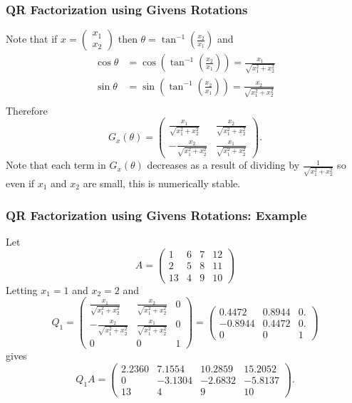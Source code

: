 \documentclass{beamer}
\begin{document}
\begin{frame}\frametitle{QR Factorization using Givens Rotations}
	Note that if $x = \begin{pmatrix} x_1 \\ x_2 \end{pmatrix}$ then
	\(
	\theta = \tan^{-1}\left(\frac{x_2}{x_1}\right)
	\)
	and
	\begin{align*}
		\cos\theta &= \cos\left(\tan^{-1}\left(\frac{x_2}{x_1}\right)\right) = \frac{x_1}{\sqrt{x_1^2 + x_2^2}} \\
		\sin\theta &= \sin\left(\tan^{-1}\left(\frac{x_2}{x_1}\right)\right) = \frac{x_2}{\sqrt{x_1^2 + x_2^2}} \\
	\end{align*}
	Therefore
	\[ 
		G_x(\theta) = 
			\begin{pmatrix}
	    		\frac{x_1}{\sqrt{x_1^2 + x_2^2}} & \frac{x_2}{\sqrt{x_1^2 + x_2^2}}\\
	    		-\frac{x_2}{\sqrt{x_1^2 + x_2^2}} & \frac{x_1}{\sqrt{x_1^2 + x_2^2}}
	  		\end{pmatrix}.
	\]
	Note that each term in $G_x(\theta)$ decreases as a result of dividing by $ \frac{1}{\sqrt{x_1^2+x_2^2}} $ so even if $x_1$ and $x_2$ are small, this is numerically stable.

\end{frame}

\begin{frame}\frametitle{QR Factorization using Givens Rotations: Example}
	Let
	\[
		A = \begin{pmatrix}
 				1 & 6 & 7 & 12 \\
 				2 & 5 & 8 & 11 \\
 				13 & 4 & 9 & 10
 			\end{pmatrix}
	\]
	Letting $x_1=1$ and $x_2=2$ and 
	\[
		Q_1 = 
			\begin{pmatrix}
 			\frac{x_1}{\sqrt{x_1^2+x_2^2}} & \frac{x_2}{\sqrt{x_1^2+x_2^2}} & 0 \\
 			-\frac{x_2}{\sqrt{x_1^2+x_2^2}} & \frac{x_1}{\sqrt{x_1^2+x_2^2}} & 0 \\
 			0 & 0 & 1
 			\end{pmatrix}
 			=
 			\begin{pmatrix}
				0.4472 & 0.8944 & 0. \\
 				-0.8944 & 0.4472 & 0.\\
 				 0 & 0 & 1
 			\end{pmatrix}
	\]
	gives
	\[
		Q_1 A = 
			\begin{pmatrix}
    			2.2360 & 7.1554 & 10.2859 & 15.2052 \\
				0 & -3.1304 & -2.6832 & -5.8137 \\
				13 & 4 & 9 & 10
			\end{pmatrix}.
	\]
\end{frame}
\end{document}
